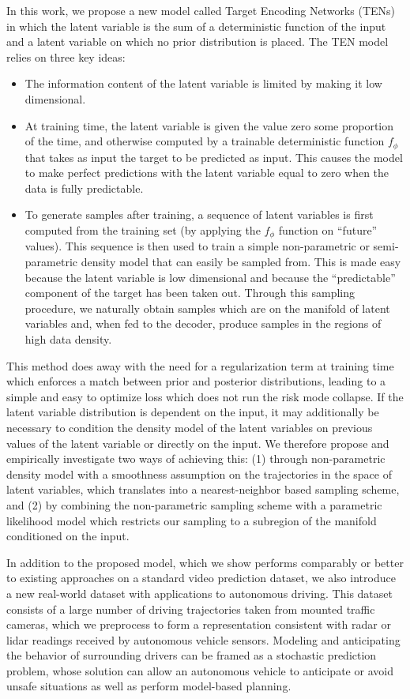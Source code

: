 \documentclass{article}
\begin{document}
In this work, we propose a new model called Target Encoding Networks (TENs) in which the latent variable is the sum of a deterministic function of the input and a latent variable on which no prior distribution is placed.
The TEN model relies on three key ideas:
%
\begin{itemize}
  \item
    The information content of the latent variable is limited by making it low dimensional.
  \item
    At training time, the latent variable is given the value zero some proportion of the time, and otherwise computed by a trainable deterministic function $f_\phi$ that takes as input the target to be predicted as input.
  This causes the model to make perfect predictions with the latent variable equal to zero when the data is fully predictable.
  \item
    To generate samples after training, a sequence of latent variables is first computed from the training set (by applying the $f_\phi$ function on ``future'' values).
    This sequence is then used to train a simple non-parametric or semi-parametric density model that can easily be sampled from.
    This is made easy because the latent variable is low dimensional and because the ``predictable'' component of the target has been taken out.
    Through this sampling procedure, we naturally obtain samples which are on the manifold of latent variables and, when fed to the decoder, produce samples in the regions of high data density.
\end{itemize}

This method does away with the need for a regularization term at training time which enforces a match between prior and posterior distributions, leading to a simple and easy to optimize loss which does not run the risk mode collapse.
If the latent variable distribution is dependent on the input, it may additionally be necessary to condition the density model of the latent variables on previous values of the latent variable or directly on the input.
We therefore propose and empirically investigate two ways of achieving this: (1) through non-parametric density model with a smoothness assumption on the trajectories in the space of latent variables, which translates into a nearest-neighbor based sampling scheme, and (2) by combining the non-parametric sampling scheme with a parametric likelihood model which restricts our sampling to a subregion of the manifold conditioned on the input.

In addition to the proposed model, which we show performs comparably or better to existing approaches on a standard video prediction dataset, we also introduce a new real-world dataset with applications to autonomous driving.
This dataset consists of a large number of driving trajectories taken from mounted traffic cameras, which we preprocess to form a representation consistent with radar or lidar readings received by autonomous vehicle sensors.
Modeling and anticipating the behavior of surrounding drivers can be framed as a stochastic prediction problem, whose solution can allow an autonomous vehicle to anticipate or avoid unsafe situations as well as perform model-based planning.
\end{document}
